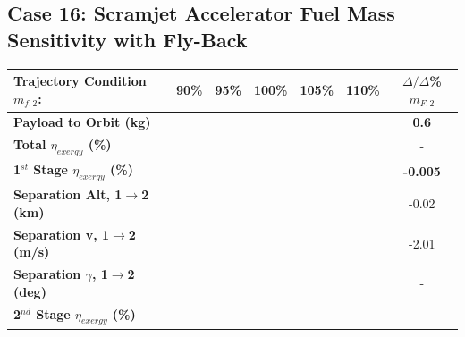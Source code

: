 \subsection{Case 16: Scramjet Accelerator Fuel Mass Sensitivity with Fly-Back}

\begin{table}[ht]%
	\centering
\begin{tabular}{l c c c c c c} 
	\hline \textbf{Trajectory Condition}   \qquad  $m_{f,2}$:
	&90\%
	&95\%
	&100\%
	&105\%
	&110\%
	& $\Delta/\Delta$\%$m_{F,2}$
	\\
	\hline \textbf{Payload to Orbit (kg)}
	& \textbf{\PayloadToOrbitmFuelNinety}
	& \textbf{\PayloadToOrbitmFuelNinetyFive}
	& \textbf{\PayloadToOrbitmFuelStandard}
	& \textbf{\PayloadToOrbitmFuelOneHundredFive}
	& \textbf{\PayloadToOrbitmFuelOneHundredTen}
	&\textbf{0.6}
	\\
	\textbf{Total $\eta_{exergy}$ (\%)}
	& \textbf{\totalExergyEffmFuelNinety}
	& \textbf{\totalExergyEffmFuelNinetyFive}
	& \textbf{\totalExergyEffmFuelStandard}
	& \textbf{\totalExergyEffmFuelOneHundredFive}
	& \textbf{\totalExergyEffmFuelOneHundredTen}
	& -
	\\
	\hline 
	\textbf{1$^{st}$ Stage $\eta_{exergy}$ (\%)}
	& \textbf{\firstExergyEffmFuelNinety}
	& \textbf{\firstExergyEffmFuelNinetyFive}
	& \textbf{\firstExergyEffmFuelStandard}
	& \textbf{\firstExergyEffmFuelOneHundredFive}
	& \textbf{\firstExergyEffmFuelOneHundredTen}
	& \textbf{-0.005}
	\\
	\textbf{Separation Alt, 1$\rightarrow$2 (km)}
	& \firstsecondSeparationAltmFuelNinety
	& \firstsecondSeparationAltmFuelNinetyFive
	& \firstsecondSeparationAltmFuelStandard
	& \firstsecondSeparationAltmFuelOneHundredFive
	& \firstsecondSeparationAltmFuelOneHundredTen
	&-0.02
	\\
	\textbf{Separation v, 1$\rightarrow$2 (m/s)}
	& \firstsecondSeparationvmFuelNinety
	& \firstsecondSeparationvmFuelNinetyFive
	& \firstsecondSeparationvmFuelStandard
	& \firstsecondSeparationvmFuelOneHundredFive
	& \firstsecondSeparationvmFuelOneHundredTen
	&-2.01
	\\
	\textbf{Separation $\gamma$, 1$\rightarrow$2 (deg)}
	& \firstsecondSeparationgammamFuelNinety
	& \firstsecondSeparationgammamFuelNinetyFive
	& \firstsecondSeparationgammamFuelStandard
	& \firstsecondSeparationgammamFuelOneHundredFive
	& \firstsecondSeparationgammamFuelOneHundredTen
	& -
	\\
	\hline 
	\textbf{2$^{nd}$ Stage $\eta_{exergy}$ (\%)}
	& \textbf{\secondExergyEffmFuelNinety}

\end{tabular}
\end{table}
